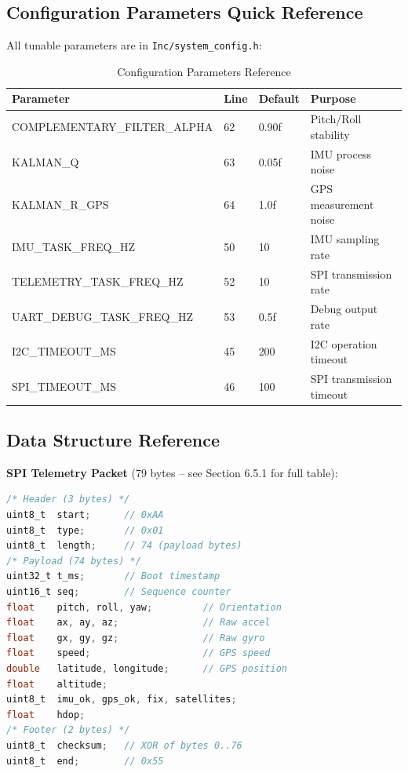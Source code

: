 \documentclass[11pt,a4paper]{article}
\begin{document}
\subsection{Configuration Parameters Quick Reference}

All tunable parameters are in \texttt{Inc/system\_config.h}:

\begin{table}[H]
\centering
\begin{tabular}{@{}llll@{}}
\toprule
\textbf{Parameter} & \textbf{Line} & \textbf{Default} & \textbf{Purpose} \\
\midrule
COMPLEMENTARY\_FILTER\_ALPHA & 62 & 0.90f & Pitch/Roll stability \\
KALMAN\_Q & 63 & 0.05f & IMU process noise \\
KALMAN\_R\_GPS & 64 & 1.0f & GPS measurement noise \\
IMU\_TASK\_FREQ\_HZ & 50 & 10 & IMU sampling rate \\
TELEMETRY\_TASK\_FREQ\_HZ & 52 & 10 & SPI transmission rate \\
UART\_DEBUG\_TASK\_FREQ\_HZ & 53 & 0.5f & Debug output rate \\
I2C\_TIMEOUT\_MS & 45 & 200 & I2C operation timeout \\
SPI\_TIMEOUT\_MS & 46 & 100 & SPI transmission timeout \\
\bottomrule
\end{tabular}
\caption{Configuration Parameters Reference}
\end{table}

\subsection{Data Structure Reference}

\textbf{SPI Telemetry Packet} (79 bytes -- see Section 6.5.1 for full table):

\begin{lstlisting}[language=C]
/* Header (3 bytes) */
uint8_t  start;      // 0xAA
uint8_t  type;       // 0x01
uint8_t  length;     // 74 (payload bytes)
/* Payload (74 bytes) */
uint32_t t_ms;       // Boot timestamp
uint16_t seq;        // Sequence counter
float    pitch, roll, yaw;         // Orientation
float    ax, ay, az;               // Raw accel
float    gx, gy, gz;               // Raw gyro
float    speed;                    // GPS speed
double   latitude, longitude;      // GPS position
float    altitude;
uint8_t  imu_ok, gps_ok, fix, satellites;
float    hdop;
/* Footer (2 bytes) */
uint8_t  checksum;   // XOR of bytes 0..76
uint8_t  end;        // 0x55
\end{lstlisting}
\end{document}
